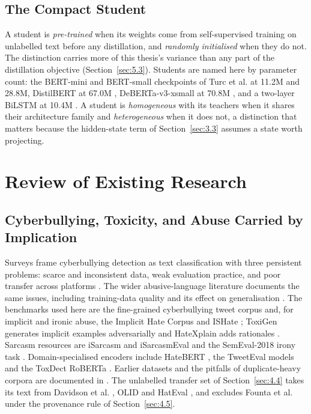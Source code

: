 \subsection{The Compact Student}
A student is \emph{pre-trained} when its weights come from self-supervised training on unlabelled text
before any distillation, and \emph{randomly initialised} when they do not. The distinction carries more
of this thesis's variance than any part of the distillation objective (Section~\ref{sec:5.3}). Students
are named here by parameter count: the BERT-mini and BERT-small checkpoints of Turc et al.
\cite{turc2019wellread} at 11.2M and 28.8M, DistilBERT at 67.0M \cite{sanh2019distilbert},
DeBERTa-v3-xsmall at 70.8M \cite{he2023debertav3}, and a two-layer BiLSTM at 10.4M
\cite{tang2019distilling}. A student is \emph{homogeneous} with its teachers when it shares their
architecture family and \emph{heterogeneous} when it does not, a distinction that matters because the
hidden-state term of Section~\ref{sec:3.3} assumes a state worth projecting.

\section{Review of Existing Research}
\label{sec:2.review}
\subsection{Cyberbullying, Toxicity, and Abuse Carried by Implication}
\label{sec:2.1}
Surveys frame cyberbullying detection as text classification with three persistent problems: scarce
and inconsistent data, weak evaluation practice, and poor transfer across platforms
\cite{rosa2019automatic, salawu2020approaches, emmery2021current}. The wider abusive-language
literature documents the same issues, including training-data quality and its effect on
generalisation \cite{fortuna2018survey, vidgen2020directions, yin2021towards}. The benchmarks used
here are the fine-grained cyberbullying tweet corpus \cite{wang2020sosnet} and, for implicit and
ironic abuse, the Implicit Hate Corpus \cite{elsherief2021latent} and ISHate
\cite{ocampo2023indepth}; ToxiGen generates implicit examples adversarially
\cite{hartvigsen2022toxigen} and HateXplain adds rationales \cite{mathew2021hatexplain}. Sarcasm
resources are iSarcasm and iSarcasmEval \cite{oprea2020isarcasm, abufarha2022semeval} and the
SemEval-2018 irony task \cite{vanhee2018semeval}. Domain-specialised encoders include HateBERT
\cite{caselli2021hatebert}, the TweetEval models \cite{barbieri2020tweeteval} and the ToxDect
RoBERTa \cite{zhou2021challenges}. Earlier datasets and the pitfalls of duplicate-heavy corpora are
documented in \cite{vanhee2018automatic, founta2018large, davidson2017automated, borkan2019nuanced}.
The unlabelled transfer set of Section~\ref{sec:4.4} takes its text from Davidson et al.
\cite{davidson2017automated}, OLID \cite{zampieri2019olid} and HatEval \cite{basile2019hateval}, and
excludes Founta et al. under the provenance rule of Section~\ref{sec:4.5}.

